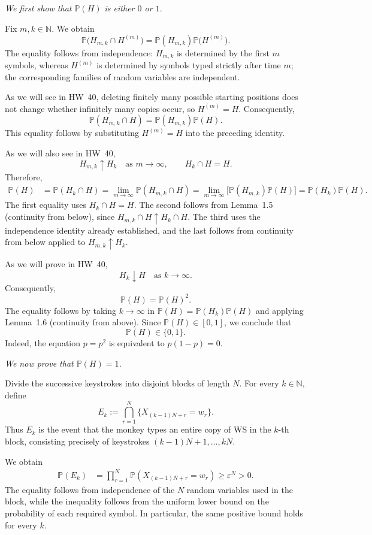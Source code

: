 \documentclass[11pt,a4paper]{article}
\begin{document}
\textit{We first show that $\mathbb P(H)$ is either $0$ or $1$.}

Fix $m,k\in\mathbb N$. We obtain
\[
\mathbb P\bigl(H_{m,k}\cap H^{(m)}\bigr)
=\mathbb P(H_{m,k})\mathbb P\bigl(H^{(m)}\bigr).
\]
The equality follows from independence: $H_{m,k}$ is determined by the first $m$ symbols, whereas $H^{(m)}$ is determined by symbols typed strictly after time $m$; the corresponding families of random variables are independent.

As we will see in HW~40, deleting finitely many possible starting positions does not change whether infinitely many copies occur, so $H^{(m)}=H$. Consequently,
\[
\mathbb P(H_{m,k}\cap H)
=\mathbb P(H_{m,k})\mathbb P(H).
\]
This equality follows by substituting $H^{(m)}=H$ into the preceding identity.

As we will also see in HW~40,
\[
H_{m,k}\uparrow H_k
\quad\text{as }m\to\infty,
\qquad H_k\cap H=H.
\]
Therefore,
\[
\begin{aligned}
\mathbb P(H)
&=\mathbb P(H_k\cap H) =\lim_{m\to\infty}\mathbb P(H_{m,k}\cap H) =\lim_{m\to\infty}\bigl[\mathbb P(H_{m,k})\mathbb P(H)\bigr] =\mathbb P(H_k)\mathbb P(H).
\end{aligned}
\]
The first equality uses $H_k\cap H=H$. The second follows from Lemma~1.5 (continuity from below), since $H_{m,k}\cap H\uparrow H_k\cap H$. The third uses the independence identity already established, and the last follows from continuity from below applied to $H_{m,k}\uparrow H_k$.

As we will prove in HW~40,
\[
H_k\downarrow H
\quad\text{as }k\to\infty.
\]
Consequently,
\[
\mathbb P(H)=\mathbb P(H)^2.
\]
The equality follows by taking $k\to\infty$ in $\mathbb P(H)=\mathbb P(H_k)\mathbb P(H)$ and applying Lemma~1.6 (continuity from above). Since $\mathbb P(H)\in[0,1]$, we conclude that
\[
\mathbb P(H)\in\{0,1\}.
\]
Indeed, the equation $p=p^2$ is equivalent to $p(1-p)=0$.

\textit{We now prove that $\mathbb P(H)=1$.}

Divide the successive keystrokes into disjoint blocks of length $N$. For every $k\in\mathbb N$, define
\[
E_k:=\bigcap_{r=1}^{N}
\{X_{(k-1)N+r}=w_r\}.
\]
Thus $E_k$ is the event that the monkey types an entire copy of WS in the $k$-th block, consisting precisely of keystrokes $(k-1)N+1,\ldots,kN$.

We obtain
\[
\begin{aligned}
\mathbb P(E_k)
&=\prod_{r=1}^{N}\mathbb P(X_{(k-1)N+r}=w_r) \ge\varepsilon^N>0.
\end{aligned}
\]
The equality follows from independence of the $N$ random variables used in the block, while the inequality follows from the uniform lower bound on the probability of each required symbol. In particular, the same positive bound holds for every $k$.
\end{document}
